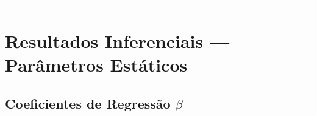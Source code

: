 \documentclass[
]{article}
\begin{document}
\begin{center}\rule{0.5\linewidth}{0.5pt}\end{center}

\section{Resultados Inferenciais --- Parâmetros
Estáticos}\label{resultados-inferenciais-paruxe2metros-estuxe1ticos}

\subsection{\texorpdfstring{Coeficientes de Regressão
\(\beta\)}{Coeficientes de Regressão \textbackslash beta}}\label{coeficientes-de-regressuxe3o-beta}

\begingroup\fontsize{9}{11}\selectfont
\end{document}
